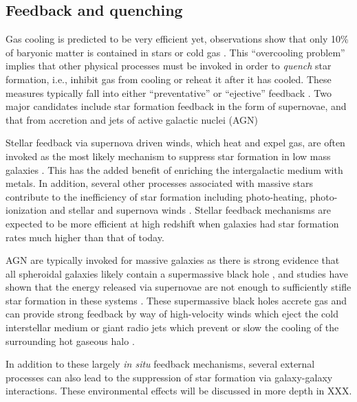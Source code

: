\subsection{Feedback and quenching}

Gas cooling is predicted to be very efficient yet, observations show that only 10\% of baryonic matter is contained in stars or cold gas \citep{Fukugita2004}. This ``overcooling problem'' implies that other physical processes must be invoked in order to \textit{quench} star formation, i.e., inhibit gas from cooling or reheat it after it has cooled. These measures typically fall into either ``preventative'' or ``ejective'' feedback \citep{Gabor2010,Keres2009b}. Two major candidates include star formation feedback in the form of supernovae, and that from accretion and jets of active galactic nuclei (AGN)

Stellar feedback via supernova driven winds, which heat and expel gas, are often invoked as the most likely mechanism to suppress star formation in low mass galaxies \citep{DekelSilk1986,White1978}. This has the added benefit of enriching the intergalactic medium with metals. In addition, several other processes associated with massive stars contribute to the inefficiency of star formation including photo-heating, photo-ionization and stellar and supernova winds \citep[e.g., review by][]{Hopkins2012}. Stellar feedback mechanisms are expected to be more efficient at high redshift when galaxies had star formation rates much higher than that of today. 

AGN are typically invoked for massive galaxies as there is strong evidence that all spheroidal galaxies likely contain a supermassive black hole \citep{KormendyHo2013}, and studies have shown that the energy released via supernovae are not enough to sufficiently stifle star formation in these systems \citep{Springel2005}. These supermassive black holes accrete gas and can provide strong feedback by way of high-velocity winds which eject the cold interstellar medium or giant radio jets which prevent or slow the cooling of the surrounding hot gaseous halo \citep{Fabian2012,HeckmanBest2014}.  

In addition to these largely \textit{in situ} feedback mechanisms, several external processes can also lead to the suppression of star formation via galaxy-galaxy interactions. These environmental effects will be discussed in more depth in XXX. 


